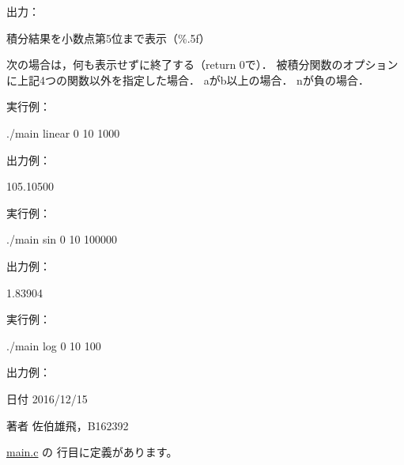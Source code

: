 出力：
\begin{DoxyItemize}
\item 積分結果を小数点第5位まで表示（\%.5f）
\item 次の場合は，何も表示せずに終了する（return 0で）． 被積分関数のオプションに上記4つの関数以外を指定した場合． aがb以上の場合． nが負の場合．
\end{DoxyItemize}

実行例： \begin{DoxyVerb}./main linear 0 10 1000
\end{DoxyVerb}
 出力例： \begin{DoxyVerb}105.10500
\end{DoxyVerb}
 実行例： \begin{DoxyVerb}./main sin 0 10 100000
\end{DoxyVerb}
 出力例： \begin{DoxyVerb}1.83904
\end{DoxyVerb}
 実行例： \begin{DoxyVerb}./main log 0 10 100
\end{DoxyVerb}
 出力例： \begin{DoxyVerb}\end{DoxyVerb}
 \begin{DoxyDate}{日付}
2016/12/15 
\end{DoxyDate}
\begin{DoxyAuthor}{著者}
佐伯雄飛，\-B162392 
\end{DoxyAuthor}


 \hyperlink{main_8c_source}{main.\-c} の  行目に定義があります。


